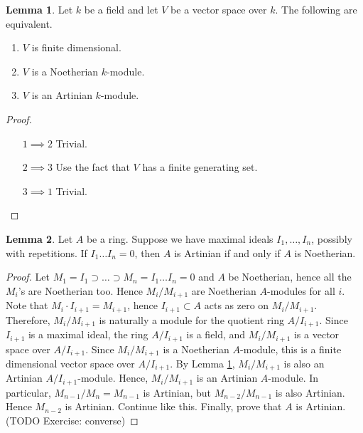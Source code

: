 \documentclass{article}
\theoremstyle{definition}\newtheorem{definition}{Definition}[section]
\theoremstyle{definition}\newtheorem{remark}[definition]{Remark}
\theoremstyle{definition}\newtheorem*{example}{Example}
\theoremstyle{definition}\newtheorem*{note}{Note}
\newtheorem{lemma}[definition]{Lemma}
\begin{document}

\begin{lemma}
\label{lem:12.11}
Let $ k $ be a field and let $ V $ be a vector space over $ k $. The following are equivalent.
\begin{enumerate}
\item $ V $ is finite dimensional.
\item $ V $ is a Noetherian $ k $-module.
\item $ V $ is an Artinian $ k $-module.
\end{enumerate}
\end{lemma}

\begin{proof}
\hfill
\begin{itemize}[leftmargin=0.5in]
\item[$ 1 \implies 2 $] Trivial.
\item[$ 2 \implies 3 $] Use the fact that $ V $ has a finite generating set.
\item[$ 3 \implies 1 $] Trivial.
\end{itemize}
\end{proof}

\begin{lemma}
\label{lem:12.12}
Let $ A $ be a ring. Suppose we have maximal ideals $ I_1, \dots, I_n $, possibly with repetitions. If $ I_1 \dots I_n = 0 $, then $ A $ is Artinian if and only if $ A $ is Noetherian.
\end{lemma}

\begin{proof}
Let $ M_1 = I_1 \supset \dots \supset M_n = I_1 \dots I_n = 0 $ and $ A $ be Noetherian, hence all the $ M_i $'s are Noetherian too. Hence $ M_i / M_{i + 1} $ are Noetherian $ A $-modules for all $ i $. Note that $ M_i \cdot I_{i + 1} = M_{i + 1} $, hence $ I_{i + 1} \subset A $ acts as zero on $ M_i / M_{i + 1} $. Therefore, $ M_i / M_{i + 1} $ is naturally a module for the quotient ring $ A / I_{i + 1} $. Since $ I_{i + 1} $ is a maximal ideal, the ring $ A / I_{i + 1} $ is a field, and $ M_i / M_{i + 1} $ is a vector space over $ A / I_{i + 1} $. Since $ M_i / M_{i + 1} $ is a Noetherian $ A $-module, this is a finite dimensional vector space over $ A / I_{i + 1} $. By Lemma \ref{lem:12.11}, $ M_i / M_{i + 1} $ is also an Artinian $ A / I_{i + 1} $-module. Hence, $ M_i / M_{i + 1} $ is an Artinian $ A $-module. In particular, $ M_{n - 1} / M_n = M_{n - 1} $ is Artinian, but $ M_{n - 2} / M_{n - 1} $ is also Artinian. Hence $ M_{n - 2} $ is Artinian. Continue like this. Finally, prove that $ A $ is Artinian. (TODO Exercise: converse)
\end{proof}
\end{document}
